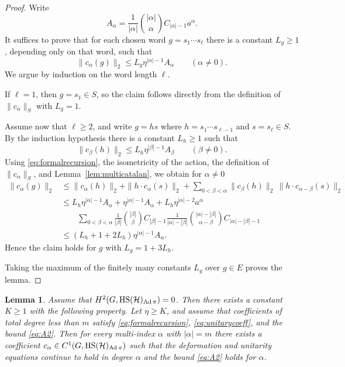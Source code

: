 \documentclass[12pt]{amsproc}
\theoremstyle{plain}
\newtheorem{lemma}[theorem]{Lemma}
\theoremstyle{definition}
\numberwithin{equation}{section}
\newcommand{\HS}{{\rm HS}}
\DeclareMathOperator{\Ad}{Ad}
\begin{document}
\begin{proof}
Write
\[
A_\alpha=\frac{1}{|\alpha|}\binom{|\alpha|}{\alpha}C_{|\alpha|-1}a^\alpha.
\]
It suffices to prove that for each chosen word $g=s_1\cdots s_\ell$ there is a constant $L_g\ge 1$, depending only on that word, such that
\[
\|c_\alpha(g)\|_2\le L_g \eta^{|\alpha|-1}A_\alpha
\qquad (\alpha\ne 0).
\]
We argue by induction on the word length $\ell$.

If $\ell=1$, then $g=s_1\in S$, so the claim follows directly from the definition of $\|c_\alpha\|_S$ with $L_g=1$.

Assume now that $\ell\ge 2$, and write $g=hs$ where $h=s_1\cdots s_{\ell-1}$ and $s=s_\ell\in S$. By the induction hypothesis there is a constant $L_h\ge 1$ such that
\[
\|c_\beta(h)\|_2\le L_h \eta^{|\beta|-1}A_\beta
\qquad (\beta\ne 0).
\]
Using \eqref{eq:formalrecursion}, the isometricity of the action, the definition of $\|c_\alpha\|_S$, and Lemma~\ref{lem:multicatalan}, we obtain for $\alpha\ne 0$
\begin{align*}
\|c_\alpha(g)\|_2
&\le \|c_\alpha(h)\|_2+\|h\cdot c_\alpha(s)\|_2
+\sum_{0<\beta<\alpha}\|c_\beta(h)\|_2\,\|h\cdot c_{\alpha-\beta}(s)\|_2\\
&\le L_h \eta^{|\alpha|-1}A_\alpha+\eta^{|\alpha|-1}A_\alpha
+L_h \eta^{|\alpha|-2}a^\alpha
\\
&\qquad
\sum_{0<\beta<\alpha}
\frac{1}{|\beta|}\binom{|\beta|}{\beta}C_{|\beta|-1}
\frac{1}{|\alpha|-|\beta|}\binom{|\alpha|-|\beta|}{\alpha-\beta}C_{|\alpha|-|\beta|-1}\\
&\le (L_h+1+2L_h)\eta^{|\alpha|-1}A_\alpha.
\end{align*}
Hence the claim holds for $g$ with $L_g=1+3L_h$.

Taking the maximum of the finitely many constants $L_g$ over $g\in E$ proves the lemma.
\end{proof}

\begin{lemma}\label{lem:onestep}
Assume that $H^2(G,\HS(\mathcal H)_{\Ad\pi})=0$. Then there exists a constant $K\ge 1$ with the following property. Let $\eta\ge K$, and assume that coefficients of total degree less than $m$ satisfy \eqref{eq:formalrecursion}, \eqref{eq:unitarycoeff}, and the bound \eqref{eq:A2}. Then for every multi-index $\alpha$ with $|\alpha|=m$ there exists a coefficient $c_\alpha\in C^1(G,\HS(\mathcal H)_{\Ad\pi})$ such that the deformation and unitarity equations continue to hold in degree $\alpha$ and the bound \eqref{eq:A2} holds for $\alpha$.
\end{lemma}
\end{document}
